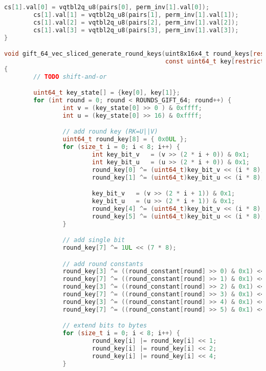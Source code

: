 \begin{lstlisting}[language=c, caption={gift\_vec\_sliced.c}]
        cs[1].val[0] = vqtbl2q_u8(pairs[0], perm_inv[1].val[0]);
        cs[1].val[1] = vqtbl2q_u8(pairs[1], perm_inv[1].val[1]);
        cs[1].val[2] = vqtbl2q_u8(pairs[2], perm_inv[1].val[2]);
        cs[1].val[3] = vqtbl2q_u8(pairs[3], perm_inv[1].val[3]);
}

void gift_64_vec_sliced_generate_round_keys(uint8x16x4_t round_keys[restrict ROUNDS_GIFT_64][2],
                                            const uint64_t key[restrict 2])
{
        // TODO shift-and-or

        uint64_t key_state[] = {key[0], key[1]};
        for (int round = 0; round < ROUNDS_GIFT_64; round++) {
                int v = (key_state[0] >> 0 ) & 0xffff;
                int u = (key_state[0] >> 16) & 0xffff;

                // add round key (RK=U||V)
                uint64_t round_key[8] = { 0x0UL };
                for (size_t i = 0; i < 8; i++) {
                        int key_bit_v   = (v >> (2 * i + 0)) & 0x1;
                        int key_bit_u   = (u >> (2 * i + 0)) & 0x1;
                        round_key[0] ^= (uint64_t)key_bit_v << (i * 8);
                        round_key[1] ^= (uint64_t)key_bit_u << (i * 8);

                        key_bit_v   = (v >> (2 * i + 1)) & 0x1;
                        key_bit_u   = (u >> (2 * i + 1)) & 0x1;
                        round_key[4] ^= (uint64_t)key_bit_v << (i * 8);
                        round_key[5] ^= (uint64_t)key_bit_u << (i * 8);
                }

                // add single bit
                round_key[7] ^= 1UL << (7 * 8);

                // add round constants
                round_key[3] ^= ((round_constant[round] >> 0) & 0x1) << (0 * 8);
                round_key[7] ^= ((round_constant[round] >> 1) & 0x1) << (0 * 8);
                round_key[3] ^= ((round_constant[round] >> 2) & 0x1) << (1 * 8);
                round_key[7] ^= ((round_constant[round] >> 3) & 0x1) << (1 * 8);
                round_key[3] ^= ((round_constant[round] >> 4) & 0x1) << (2 * 8);
                round_key[7] ^= ((round_constant[round] >> 5) & 0x1) << (2 * 8);

                // extend bits to bytes
                for (size_t i = 0; i < 8; i++) {
                        round_key[i] |= round_key[i] << 1;
                        round_key[i] |= round_key[i] << 2;
                        round_key[i] |= round_key[i] << 4;
                }


\end{lstlisting}
